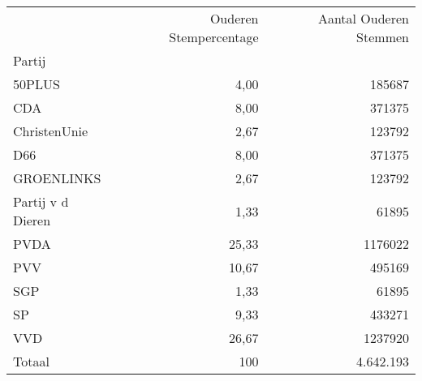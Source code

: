 \begin{tabular}{lrr}
\toprule
{} &  Ouderen Stempercentage &  Aantal Ouderen Stemmen \\
Partij                &                         &                         \\
\midrule
50PLUS                &                    4,00 &                  185687 \\
CDA                   &                    8,00 &                  371375 \\
ChristenUnie          &                    2,67 &                  123792 \\
D66                   &                    8,00 &                  371375 \\
GROENLINKS            &                    2,67 &                  123792 \\
Partij v d Dieren &                    1,33 &                   61895 \\
PVDA                  &                   25,33 &                 1176022 \\
PVV                   &                   10,67 &                  495169 \\
SGP                   &                    1,33 &                   61895 \\
SP                    &                    9,33 &                  433271 \\
VVD                   &                   26,67 &                 1237920 \\
\midrule
Totaal                &                     100 &				4.642.193 \\
\bottomrule
\end{tabular}
